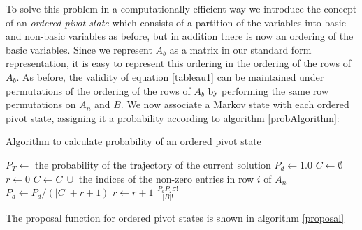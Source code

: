 \documentclass{article}
\begin{document}
To solve this problem in a computationally efficient way we introduce the concept of an \textit{ordered pivot state} which consists of a partition of the variables into basic and non-basic variables as before, but in addition there is now an ordering of the basic variables. Since we represent $A_b$ as a matrix in our standard form representation, it is easy to represent this ordering in the ordering of the rows of $A_b$. As before, the validity of equation \ref{tableau1} can be maintained under permutations of the ordering of the rows of $A_b$ by performing the same row permutations on $A_n$ and $B$. We now associate a Markov state with each ordered pivot state, assigning it a probability according to algorithm \ref{probAlgorithm}:

\begin{algorithm}
	\caption{Algorithm to calculate probability of an ordered pivot state}
	\label{probAlgorithm}
	\begin{algorithmic}
		 
		\State $P_T \leftarrow$ the probability of the trajectory of the current solution
		\State $P_d \leftarrow 1.0$
		\State $C \leftarrow \emptyset$
		\State $r \leftarrow 0$
		\State $C \leftarrow C \ \cup $ the indices of the non-zero entries in row $i$ of $A_n$
		\State $P_d \leftarrow P_d/(|C|+r+1)$
		\State $r \leftarrow r + 1$
		\EndIf
		\EndFor
		\State \Return $\frac{P_d P_T\sigma!}{|B|!}$
		\EndFunction
	\end{algorithmic}
\end{algorithm}

The proposal function for ordered pivot states is shown in algorithm \ref{proposal}
\end{document}
